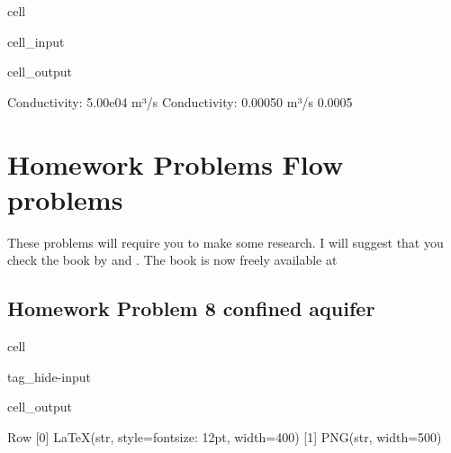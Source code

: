 \documentclass[letterpaper,10pt,english]{jupyterBook}
\begin{document}
\begin{sphinxuseclass}{cell}
\begin{sphinxVerbatimInput}
\begin{sphinxuseclass}{cell_input}
\end{sphinxuseclass}\end{sphinxVerbatimInput}
\begin{sphinxVerbatimOutput}

\begin{sphinxuseclass}{cell_output}
\begin{sphinxVerbatim}[commandchars=\\\{\}]
Conductivity: 5.00e\PYGZhy{}04 m³/s
Conductivity: 0.00050 m³/s
0.0005
\end{sphinxVerbatim}

\end{sphinxuseclass}\end{sphinxVerbatimOutput}

\end{sphinxuseclass}

\section{Homework Problems Flow problems}
\label{\detokenize{content/tutorials/T6/tutorial_06:homework-problems-flow-problems}}
\sphinxAtStartPar
These problems will require you to make some research. I will suggest that you check the  book by  and . The book is now freely available at 

\sphinxAtStartPar
{}


\subsection{Homework Problem 8 \sphinxhyphen{} confined aquifer}
\label{\detokenize{content/tutorials/T6/tutorial_06:homework-problem-8-confined-aquifer}}
\begin{sphinxuseclass}{cell}
\begin{sphinxuseclass}{tag_hide-input}\begin{sphinxVerbatimOutput}

\begin{sphinxuseclass}{cell_output}
\begin{sphinxVerbatim}[commandchars=\\\{\}]
Row
    [0] LaTeX(str, style=\PYGZob{}\PYGZsq{}font\PYGZhy{}size\PYGZsq{}: \PYGZsq{}12pt\PYGZsq{}\PYGZcb{}, width=400)
    [1] PNG(str, width=500)
\end{sphinxVerbatim}

\end{sphinxuseclass}\end{sphinxVerbatimOutput}

\end{sphinxuseclass}
\end{sphinxuseclass}
\end{document}
